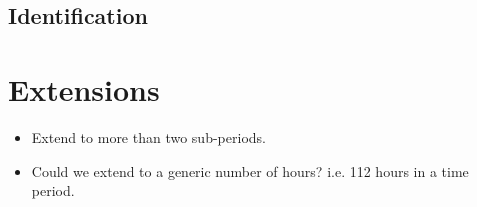 \documentclass[12pt]{article}
\numberwithin{equation}{section}
\numberwithin{figure}{section}
\numberwithin{table}{section}
\begin{document}
\subsection{Identification}


\section{Extensions}
\begin{itemize}
\item Extend to more than two sub-periods.
\item Could we extend to a generic number of hours? i.e. 112 hours in a time period.
\end{itemize}

%
%

\end{document}
